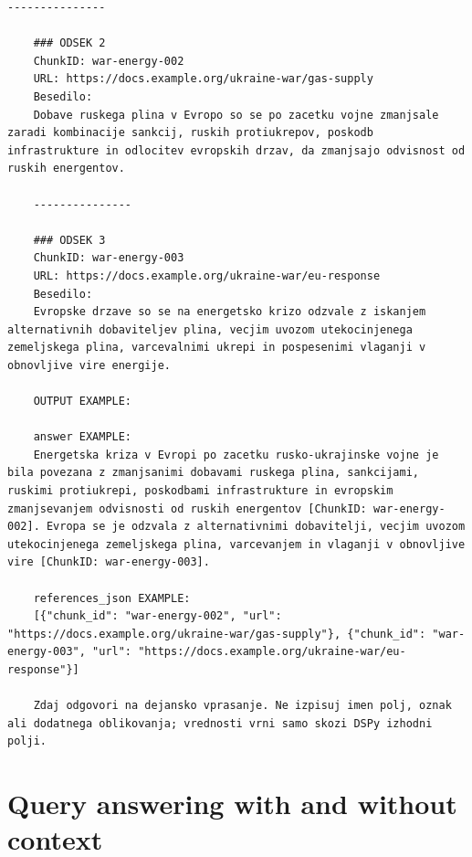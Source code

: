 \documentclass[conference]{IEEEtran}
\begin{document}
\begin{Verbatim}[breaklines=true]
    ---------------

    ### ODSEK 2
    ChunkID: war-energy-002
    URL: https://docs.example.org/ukraine-war/gas-supply
    Besedilo:
    Dobave ruskega plina v Evropo so se po zacetku vojne zmanjsale zaradi kombinacije sankcij, ruskih protiukrepov, poskodb infrastrukture in odlocitev evropskih drzav, da zmanjsajo odvisnost od ruskih energentov.

    ---------------

    ### ODSEK 3
    ChunkID: war-energy-003
    URL: https://docs.example.org/ukraine-war/eu-response
    Besedilo:
    Evropske drzave so se na energetsko krizo odzvale z iskanjem alternativnih dobaviteljev plina, vecjim uvozom utekocinjenega zemeljskega plina, varcevalnimi ukrepi in pospesenimi vlaganji v obnovljive vire energije.

    OUTPUT EXAMPLE:

    answer EXAMPLE:
    Energetska kriza v Evropi po zacetku rusko-ukrajinske vojne je bila povezana z zmanjsanimi dobavami ruskega plina, sankcijami, ruskimi protiukrepi, poskodbami infrastrukture in evropskim zmanjsevanjem odvisnosti od ruskih energentov [ChunkID: war-energy-002]. Evropa se je odzvala z alternativnimi dobavitelji, vecjim uvozom utekocinjenega zemeljskega plina, varcevanjem in vlaganji v obnovljive vire [ChunkID: war-energy-003].

    references_json EXAMPLE:
    [{"chunk_id": "war-energy-002", "url": "https://docs.example.org/ukraine-war/gas-supply"}, {"chunk_id": "war-energy-003", "url": "https://docs.example.org/ukraine-war/eu-response"}]

    Zdaj odgovori na dejansko vprasanje. Ne izpisuj imen polj, oznak ali dodatnega oblikovanja; vrednosti vrni samo skozi DSPy izhodni polji.

\end{Verbatim}
\pagebreak
\section{Query answering with and without context}
\end{document}

